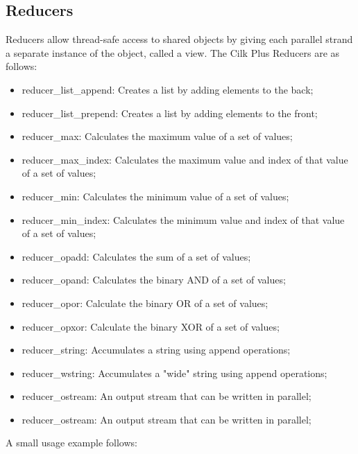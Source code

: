 \documentclass[a4paper,10pt,openright,openbib,twocolumn]{article}
\begin{document}
\subsection{Reducers}

Reducers allow thread-safe access to shared objects by giving each parallel strand a separate instance of the object, called a view. The Cilk Plus Reducers are as follows:
        \begin{itemize}
            \item reducer\_list\_append: Creates a list by adding elements to the back;
            \item reducer\_list\_prepend: Creates a list by adding elements to the front;
            \item reducer\_max: Calculates the maximum value of a set of values;
            \item reducer\_max\_index: Calculates the maximum value and index of that value of a set of values;
            \item reducer\_min: Calculates the minimum value of a set of values;
            \item reducer\_min\_index: Calculates the minimum value and index of that value of a set of values;
            \item reducer\_opadd: Calculates the sum of a set of values;
            \item reducer\_opand: Calculates the binary AND of a set of values;
            \item reducer\_opor: Calculate the binary OR of a set of values;
            \item reducer\_opxor: Calculate the binary XOR of a set of values;
            \item reducer\_string: Accumulates a string using append operations;
            \item reducer\_wstring: Accumulates a "wide" string using append operations;
            \item reducer\_ostream: An output stream that can be written in parallel;
            \item reducer\_ostream: An output stream that can be written in parallel;
        \end{itemize}

A small usage example follows:\\
\end{document}
